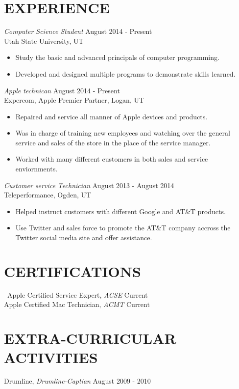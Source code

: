 \documentclass[margin, 10pt]{res} %
\begin{document}
\begin{resume}
\section{EXPERIENCE}
{\sl Computer Science Student} \hfill August 2014 - Present \\
Utah State University, UT
\begin{itemize}
\item Study the basic and advanced principals of computer programming.
\item Developed and designed multiple programs to demonstrate skills
learned.
\end{itemize}
{\sl Apple technican} \hfill August 2014 - Present \\
Expercom, Apple Premier Partner, Logan, UT
\begin{itemize}
\item Repaired and service all manner of Apple devices and products.
\item Was in charge of training new employees and watching over the
general service and sales of the store in the place of the service
manager.
\item Worked with many different customers in both sales and service
enviornments.
\end{itemize}
{\sl Customer service Technician} \hfill August 2013 - August 2014\\
Teleperformance, Ogden, UT
\begin{itemize}
\item Helped instruct customers with different Google and AT\&T
products.
\item Use Twitter and sales force to promote the AT\&T company accross
the Twitter social media site and offer assistance.
\end{itemize}
\section{CERTIFICATIONS}
\
Apple Certified Service Expert, {\sl ACSE} \hfill Current \\
Apple Certified Mac Technician, {\sl ACMT} \hfill Current \\
\section{EXTRA-CURRICULAR \\ ACTIVITIES}
Drumline, {\sl Drumline-Captian} \hfill August 2009 - 2010\\
\end{resume}
\end{document}
